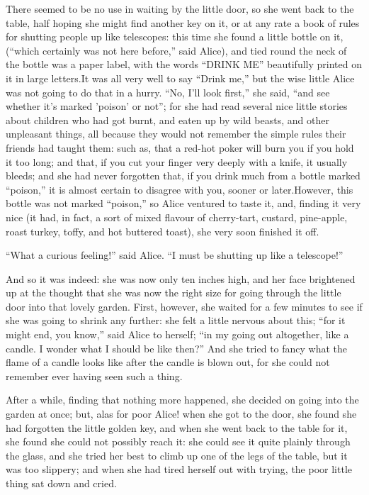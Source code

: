 \documentclass{l3proj}
\begin{document}
There seemed to be no use in waiting by the little door, so she went back
to the table, half hoping she might find another key on it, or at any rate
a book of rules for shutting people up like telescopes: this time she found
a little bottle on it, (``which certainly was not here before,'' said Alice),
and tied round the neck of the bottle was a paper label, with the words
``DRINK ME'' beautifully printed on it in large letters.It was all very well
to say ``Drink me,'' but the wise little Alice was not going to do that in a
hurry. ``No, I'll look first,'' she said, ``and see whether it's marked
'poison' or not''; for she had read several nice little stories about
children who had got burnt, and eaten up by wild beasts, and other
unpleasant things, all because they would not remember the simple rules
their friends had taught them: such as, that a red-hot poker will burn you
if you hold it too long; and that, if you cut your finger very deeply with
a knife, it usually bleeds; and she had never forgotten that, if you drink
much from a bottle marked ``poison,'' it is almost certain to disagree with
you, sooner or later.However, this bottle was not marked ``poison,'' so Alice
ventured to taste it, and, finding it very nice (it had, in fact, a sort of
mixed flavour of cherry-tart, custard, pine-apple, roast turkey, toffy, and
hot buttered toast), she very soon finished it off.

``What a curious feeling!'' said Alice. ``I must be shutting up like a
telescope!''

And so it was indeed: she was now only ten inches high, and her face
brightened up at the thought that she was now the right size for going
through the little door into that lovely garden. First, however, she waited
for a few minutes to see if she was going to shrink any further: she felt a
little nervous about this; ``for it might end, you know,'' said Alice to
herself; ``in my going out altogether, like a candle. I wonder what I should
be like then?'' And she tried to fancy what the flame of a candle looks like
after the candle is blown out, for she could not remember ever having seen
such a thing.

After a while, finding that nothing more happened, she decided on going
into the garden at once; but, alas for poor Alice! when she got to the
door, she found she had forgotten the little golden key, and when she went
back to the table for it, she found she could not possibly reach it: she
could see it quite plainly through the glass, and she tried her best to
climb up one of the legs of the table, but it was too slippery; and when
she had tired herself out with trying, the poor little thing sat down and
cried.
\end{document}

